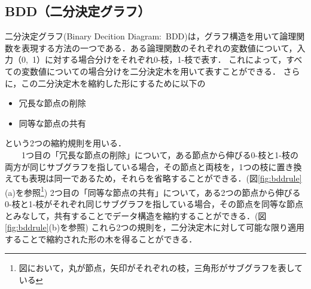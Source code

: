 \documentclass[12pt,twoside, fleqn]{ujbook}
\begin{document}
\subsection{BDD（二分決定グラフ）}
	二分決定グラフ(Binary Decition Diagram:\ BDD)\cite{Somenzi99binarydecision}は，グラフ構造を用いて論理関数を表現する方法の一つである．ある論理関数のそれぞれの変数値について，入力（0,\ 1）に対する場合分けをそれぞれ0-枝，1-枝で表す．
	これによって，すべての変数値についての場合分けを二分決定木を用いて表すことができる．
	さらに，この二分決定木を縮約した形にするために以下の
	\begin{itemize}
		\item 冗長な節点の削除
		\item 同等な節点の共有
	\end{itemize}
	という2つの縮約規則を用いる．\\
	\ \ \ \ 1つ目の「冗長な節点の削除」について，ある節点から伸びる0-枝と1-枝の両方が同じサブグラフを指している場合，その節点と両枝を，1つの枝に置き換えても表現は同一であるため，それらを省略することができる．(図\ref{fig:bddrule}(a)を参照\footnote{図において，丸が節点，矢印がそれぞれの枝，三角形がサブグラフを表している})
	2つ目の「同等な節点の共有」について，ある2つの節点から伸びる0-枝と1-枝がそれぞれ同じサブグラフを指している場合，その節点を同等な節点とみなして，共有することでデータ構造を縮約することができる．(図\ref{fig:bddrule}(b)を参照)
	これら2つの規則を，二分決定木に対して可能な限り適用することで縮約された形の木を得ることができる．\\
\end{document}

